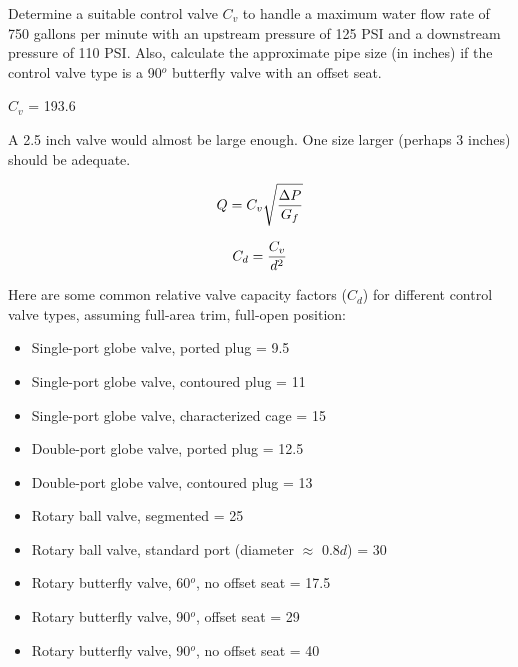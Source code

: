 

Determine a suitable control valve $C_v$ to handle a maximum water flow rate of 750 gallons per minute with an upstream pressure of 125 PSI and a downstream pressure of 110 PSI.  Also, calculate the approximate pipe size (in inches) if the control valve type is a 90$^{o}$ butterfly valve with an offset seat.







$C_v$ = 193.6

\vskip 10pt

A 2.5 inch valve would almost be large enough.  One size larger (perhaps 3 inches) should be adequate.







$$Q = C_v \sqrt{\Delta P \over G_f}$$

$$C_d = {C_v \over d^2}$$

\vskip 10pt

Here are some common relative valve capacity factors ($C_d$) for different control valve types, assuming full-area trim, full-open position:
 
\begin{itemize}
\item{} Single-port globe valve, ported plug = 9.5
\item{} Single-port globe valve, contoured plug = 11
\item{} Single-port globe valve, characterized cage = 15
\item{} Double-port globe valve, ported plug = 12.5
\item{} Double-port globe valve, contoured plug = 13
\item{} Rotary ball valve, segmented = 25
\item{} Rotary ball valve, standard port (diameter $\approx$ 0.8$d$) = 30
\item{} Rotary butterfly valve, 60$^{o}$, no offset seat = 17.5
\item{} Rotary butterfly valve, 90$^{o}$, offset seat = 29
\item{} Rotary butterfly valve, 90$^{o}$, no offset seat = 40
\end{itemize}




